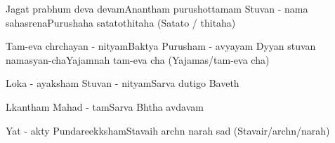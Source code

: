 \documentclass[20pt]{article}
\begin{document}
{Jagat prabhum deva devam}{Anantham purushottamam} 
{Stuvan - nama sahasrena}{Purushaha satatothitaha (Satato / thitaha)}

\slokash
{Tam-eva chrchayan - nityam}{Baktya Purusham - avyayam}
{Dyyan stuvan namasyan-cha}{Yajamnah tam-eva cha (Yajamas/tam-eva cha)}


{Loka - ayaksham Stuvan - nityam}{Sarva dutigo Baveth}

{Lkantham Mahad - tam}{Sarva Bhtha avdavam}

{Yat - akty Pundareekksham}{Stavaih archn narah sad (Stavair/archn/narah)}
\end{document}
